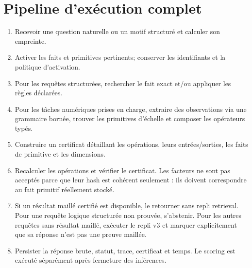 \documentclass[11pt,a4paper]{book}
\begin{document}
\chapter{Pipeline d'exécution complet}
\begin{enumerate}
\item Recevoir une question naturelle ou un motif structuré et calculer son empreinte.
\item Activer les faits et primitives pertinents; conserver les identifiants et la politique d'activation.
\item Pour les requêtes structurées, rechercher le fait exact et/ou appliquer les règles déclarées.
\item Pour les tâches numériques prises en charge, extraire des observations via une grammaire bornée, trouver les primitives d'échelle et composer les opérateurs typés.
\item Construire un certificat détaillant les opérations, leurs entrées/sorties, les faits de primitive et les dimensions.
\item Recalculer les opérations et vérifier le certificat. Les facteurs ne sont pas acceptés parce que leur hash est cohérent seulement : ils doivent correspondre au fait primitif réellement stocké.
\item Si un résultat maillé certifié est disponible, le retourner sans repli retrieval. Pour une requête logique structurée non prouvée, s'abstenir. Pour les autres requêtes sans résultat maillé, exécuter le repli v3 et marquer explicitement que sa réponse n'est pas une preuve maillée.
\item Persister la réponse brute, statut, trace, certificat et temps. Le scoring est exécuté séparément après fermeture des inférences.
\end{enumerate}
\end{document}
